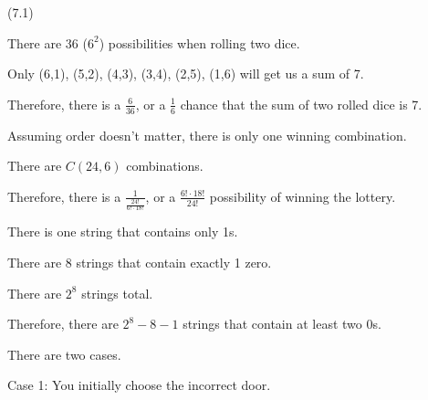 \documentclass{exam}
\begin{document}
\begin{questions}
 (7.1)

\begin{center}
There are 36 (\(6^2\)) possibilities when rolling two dice.

Only (6,1), (5,2), (4,3), (3,4), (2,5), (1,6) will get us a sum of 7.

Therefore, there is a \(\frac{6}{36}\), or a \(\frac{1}{6}\) chance that the sum of two rolled dice is 7.
\end{center}


\begin{center}
Assuming order doesn't matter, there is only one winning combination.

There are \(C(24, 6)\) combinations.

Therefore, there is a \(\frac{1}{\frac{24!}{6! \cdot 18!}}\), or a \(\frac{6! \cdot 18!}{24!}\) possibility of winning the lottery.
\end{center}

\newpage


\begin{center}
There is one string that contains only 1s.

There are 8 strings that contain exactly 1 zero.

There are \(2^8\) strings total.

Therefore, there are \(2^8 - 8 - 1\) strings that contain at least two 0s.
\end{center}


\begin{center}

There are two cases.
\vspace{10px}

Case 1: You initially choose the incorrect door.


\end{center}
\end{questions}
\end{document}
